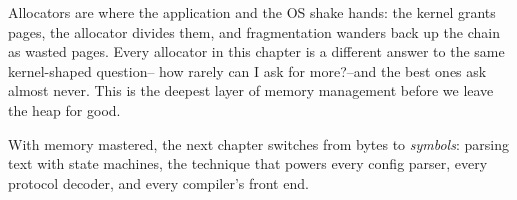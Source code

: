 \begin{osconcept}
Allocators are where the application and the OS shake hands: the
kernel grants pages, the allocator divides them, and fragmentation
wanders back up the chain as wasted pages. Every allocator in this
chapter is a different answer to the same kernel-shaped question--
how rarely can I ask for more?--and the best ones ask almost never.
This is the deepest layer of memory management before we leave the
heap for good.
\end{osconcept}

With memory mastered, the next chapter switches from bytes to
\emph{symbols}: parsing text with state machines, the technique that
powers every config parser, every protocol decoder, and every
compiler's front end.

